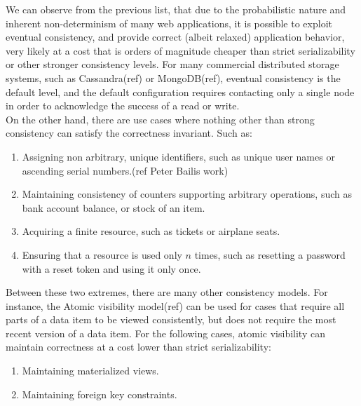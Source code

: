We can observe from the previous list, that due to the probabilistic nature and 
inherent non-determinism of many web applications, it is possible to exploit 
eventual consistency, and provide correct (albeit relaxed) application behavior, 
very likely at a cost that is orders of magnitude cheaper than strict serializability 
or other stronger consistency levels. For many commercial distributed storage 
systems, such as Cassandra(ref) or MongoDB(ref), eventual consistency is the default
level, and the default configuration requires contacting only a single node in
order to acknowledge the success of a read or write. \\

On the other hand, there are use cases where nothing other than strong consistency can
satisfy the correctness invariant. Such as:

\begin{enumerate}

\item Assigning non arbitrary, unique identifiers, such as unique user names or
ascending serial numbers.(ref Peter Bailis work)

\item Maintaining consistency of counters supporting arbitrary operations, such
as bank account balance, or stock of an item. 

\item Acquiring a finite resource, such as tickets or airplane seats. 

\item Ensuring that a resource is used only $n$ times, such as resetting a
password with a reset token and using it only once. 
\end{enumerate}

 Between these two extremes, there are many other consistency models. For
 instance, the Atomic visibility model(ref) can be used for cases that
 require all parts of a data item to be viewed consistently, but does not require
 the most recent version of a data item. For the following cases, 
 atomic visibility can maintain correctness at a cost lower than strict
 serializability: 
\begin{enumerate}
\item Maintaining materialized views.
\item Maintaining foreign key constraints.
\end{enumerate}

